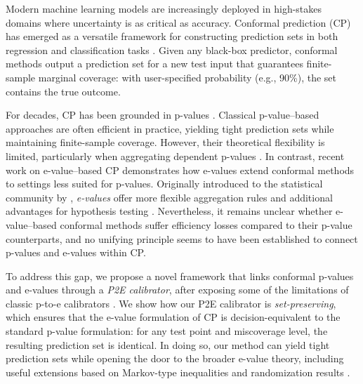 \documentclass{article}
\theoremstyle{plain}
\theoremstyle{definition}
\theoremstyle{remark}
\begin{document}










Modern machine learning models are increasingly deployed in high-stakes domains where uncertainty is as critical as accuracy. Conformal prediction (CP) has emerged as a versatile framework for constructing prediction sets in both regression and classification tasks \citep{shafer2008tutorial,angelopoulos2023conformal,papadopoulos2002inductive,vovk2005algorithmic}. Given any black-box predictor, conformal methods output a prediction set for a new test input that guarantees finite-sample marginal coverage: 
with user-specified probability (e.g., 90\%), the set contains the true outcome.  

For decades, CP has been grounded in p-values \citep{vovk2025econformal}. Classical p-value–based approaches are often efficient in practice, yielding tight prediction sets while maintaining finite-sample coverage. However, their theoretical flexibility is limited, particularly when aggregating dependent p-values \citep{vovk2022admissible}. In contrast, recent work on e-value–based CP \citep{balinsky2024,gauthier2025values,koning2025optimalconformalpredictionevalues} demonstrates how e-values extend conformal methods to settings less suited for p-values. Originally introduced to the statistical community by \citet{vovk2021values}, \textit{e-values} offer more flexible aggregation rules and additional advantages for hypothesis testing \citep{vovk2021values,vovk2024merging,wang2025only}. Nevertheless, it remains unclear whether e-value–based conformal methods suffer efficiency losses compared to their p-value counterparts, and no unifying principle seems to have been established to connect p-values and e-values within CP.  

To address this gap, we propose a novel framework that links conformal p-values and e-values through a \emph{P2E calibrator}, after exposing some of the limitations of classic p-to-e calibrators \citep{vovk2021values,evaluespoly}. We show how our P2E calibrator is \textit{set-preserving}, which ensures that the e-value formulation of CP is decision-equivalent to the standard p-value formulation: for any test point and miscoverage level, the resulting prediction set is identical. In doing so, our method can yield tight prediction sets while opening the door to the broader e-value theory, including useful extensions based on Markov-type inequalities and randomization results \citep{ramdas2023randomizedexchangeableimprovementsmarkovs}.  
\end{document}
